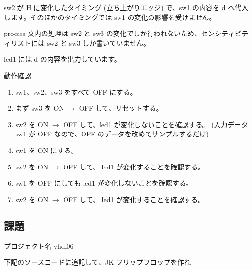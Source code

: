 \documentclass[letterpaper,10pt,dvipdfmx]{sphinxmanual}
\begin{document}
sw2 が H に変化したタイミング (立ち上がりエッジ) で、sw1 の内容を d へ代入します。そのほかのタイミングでは sw1 の変化の影響を受けません。

process 文内の処理は sw2 と sw3 の変化でしか行われないため、センシティビティリストには sw2 と sw3 しか書いていません。

led1 には d の内容を出力しています。

\begin{figure}[htbp]
\centering

\noindent{}
\end{figure}

動作確認
\begin{enumerate}
%
\item {} 
sw1、sw2、sw3 をすべて OFF にする。

\item {} 
まず sw3 を ON \(\rightarrow\) OFF して、リセットする。

\item {} 
sw2 を ON \(\rightarrow\) OFF して、led1 が変化しないことを確認する。 (入力データ sw1 が OFF なので、OFF のデータを改めてサンプルするだけ)

\item {} 
sw1 を ON にする。

\item {} 
sw2 を ON \(\rightarrow\) OFF して、 led1 が変化することを確認する。

\item {} 
sw1 を OFF にしても led1 が変化しないことを確認する。

\item {} 
sw2 を ON \(\rightarrow\) OFF して、 led1 が変化することを確認する。

\end{enumerate}


\subsection{課題}
\label{\detokenize{05_try:id14}}
プロジェクト名 vhdl06

下記のソースコードに追記して、JK フリップフロップを作れ
\end{document}

